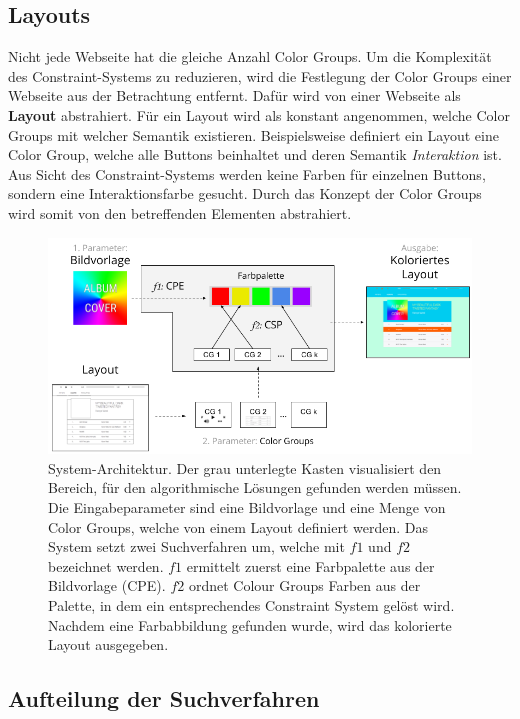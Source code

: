 \documentclass[11pt,a4paper,bibliography=totoc,twocolumn]{scrartcl}
\begin{document}
\subsection{Layouts}

Nicht jede Webseite hat die gleiche Anzahl Color Groups. Um die Komplexität des Constraint-Systems zu reduzieren, wird die Festlegung der Color Groups einer Webseite aus der Betrachtung entfernt. Dafür wird von einer Webseite als \textbf{Layout} abstrahiert. Für ein Layout wird als konstant angenommen, welche Color Groups mit welcher Semantik existieren. Beispielsweise definiert ein Layout eine Color Group, welche alle Buttons beinhaltet und deren Semantik \emph{Interaktion} ist. Aus Sicht des Constraint-Systems werden keine Farben für einzelnen Buttons, sondern eine Interaktionsfarbe gesucht. Durch das Konzept der Color Groups wird somit von den betreffenden Elementen abstrahiert.

\begin{figure}
	\centering
	\includegraphics[width=1\textwidth]{img/architecture.png}
	\caption{System-Architektur. Der grau unterlegte Kasten visualisiert den Bereich, für den algorithmische Lösungen gefunden werden müssen. Die Eingabeparameter sind eine Bildvorlage und eine Menge von Color Groups, welche von einem Layout definiert werden. Das System setzt zwei Suchverfahren um, welche mit $f1$ und $f2$ bezeichnet werden. $f1$ ermittelt zuerst eine Farbpalette aus der Bildvorlage (CPE).  $f2$ ordnet Colour Groups Farben aus der Palette, in dem ein entsprechendes Constraint System gelöst wird. Nachdem eine Farbabbildung gefunden wurde, wird das kolorierte Layout ausgegeben. }
	\label{fig:architecture}
\end{figure}

\subsection{Aufteilung der Suchverfahren}
\end{document}
